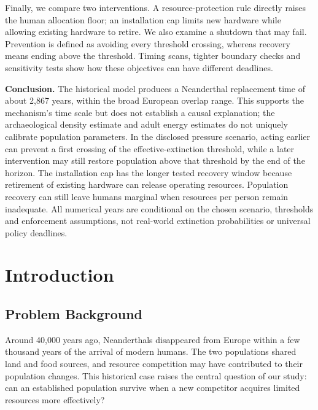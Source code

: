 \documentclass[12pt,a4paper]{article}
\theoremstyle{remark}
\begin{document}
Finally, we compare two interventions. A resource-protection rule directly raises
the human allocation floor; an installation cap limits new hardware while allowing
existing hardware to retire. We also examine a shutdown that may fail. Prevention is
defined as avoiding every threshold crossing, whereas recovery means ending above
the threshold. Timing scans, tighter boundary checks and sensitivity tests show how
these objectives can have different deadlines.

\textbf{Conclusion.} The historical model produces a Neanderthal replacement time
of about 2,867 years, within the broad European overlap range. This supports the
mechanism's time scale but does not establish a causal explanation; the archaeological
density estimate and adult energy estimates do not uniquely calibrate population
parameters. In the disclosed pressure scenario, acting earlier can prevent a first
crossing of the effective-extinction threshold, while a later intervention may still
restore population above that threshold by the end of the horizon. The installation
cap has the longer tested recovery window because retirement of existing hardware can
release operating resources. Population recovery can still leave humans marginal when
resources per person remain inadequate. All numerical years are conditional on the
chosen scenario, thresholds and enforcement assumptions, not real-world extinction
probabilities or universal policy deadlines.
\clearpage
\pagestyle{fancy}
\setcounter{tocdepth}{1} %
\tableofcontents
\clearpage

\setlength{\parskip}{0.20em}
\setlength{\abovedisplayskip}{10pt plus 2pt minus 3pt}
\setlength{\belowdisplayskip}{10pt plus 2pt minus 3pt}
\setlength{\abovedisplayshortskip}{0pt plus 2pt}
\setlength{\belowdisplayshortskip}{6pt plus 2pt minus 2pt}
\setlength{\textfloatsep}{12pt plus 2pt minus 2pt}

\section{Introduction}\label{sec:intro}

\subsection{Problem Background}

Around 40,000 years ago, Neanderthals disappeared from Europe within a few thousand years of the arrival of modern humans. The two populations shared land and food sources, and resource competition may have contributed to their population changes. This historical case raises the central question of our study: can an established population survive when a new competitor acquires limited resources more effectively?
\end{document}
